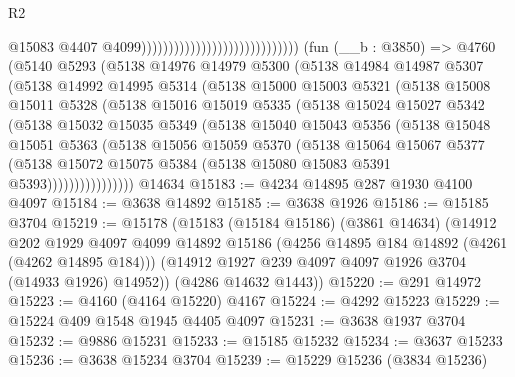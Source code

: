\begin{lexlean}{R2}
\begin{coremodule}
                                                              @15083
                                                              @4407
                                                              @4099)))))))))))))))))))))))))))))
    (fun (__b : @3850) =>
    @4760
      (@5140
        @5293
        (@5138
          @14976
          @14979
          @5300
          (@5138
            @14984
            @14987
            @5307
            (@5138
              @14992
              @14995
              @5314
              (@5138
                @15000
                @15003
                @5321
                (@5138
                  @15008
                  @15011
                  @5328
                  (@5138
                    @15016
                    @15019
                    @5335
                    (@5138
                      @15024
                      @15027
                      @5342
                      (@5138
                        @15032
                        @15035
                        @5349
                        (@5138
                          @15040
                          @15043
                          @5356
                          (@5138
                            @15048
                            @15051
                            @5363
                            (@5138
                              @15056
                              @15059
                              @5370
                              (@5138
                                @15064
                                @15067
                                @5377
                                (@5138
                                  @15072
                                  @15075
                                  @5384
                                  (@5138 @15080 @15083 @5391 @5393))))))))))))))))
    @14634
@15183 := @4234 @14895 @287 @1930 @4100 @4097
@15184 := @3638 @14892
@15185 := @3638 @1926
@15186 := @15185 @3704
@15219 := @15178
    (@15183
      (@15184 @15186)
      (@3861 @14634)
      (@14912
        @202
        @1929
        @4097
        @4099
        @14892
        @15186
        (@4256 @14895 @184 @14892 (@4261 (@4262 @14895 @184)))
        (@14912 @1927 @239 @4097 @4097 @1926 @3704 (@14933 @1926) @14952))
      (@4286 @14632 @1443))
@15220 := @291 @14972
@15223 := @4160 (@4164 @15220) @4167
@15224 := @4292 @15223
@15229 := @15224 @409 @1548 @1945 @4405 @4097
@15231 := @3638 @1937 @3704
@15232 := @9886 @15231
@15233 := @15185 @15232
@15234 := @3637 @15233
@15236 := @3638 @15234 @3704
@15239 := @15229 @15236 (@3834 @15236)

\end{coremodule}
\end{lexlean}

